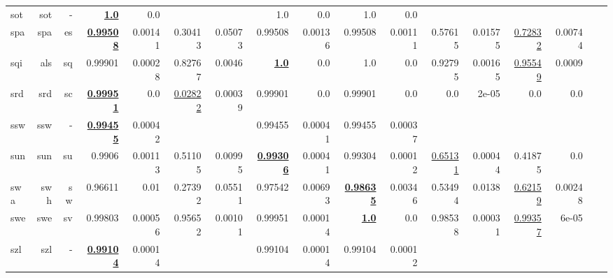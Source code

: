 \documentclass[11pt]{article}
\begin{document}
\begin{table*}[h]
{\begin{tabular}{lrrrrrrrrrrrrrrrr}
sot         & sot         & -         & \textbf{\underline{1.0}}         & 0.0         &          &          & 1.0         & 0.0         & 1.0         & 0.0         &          &          &          &          \\
spa         & spa         & es         & \textbf{\underline{0.99508}}         & 0.00141         & 0.30413         & 0.05073         & 0.99508         & 0.00136         & 0.99508         & 0.00111         & 0.57615         & 0.01575         & \underline{0.72832}         & 0.00744         \\
sqi         & als         & sq         & 0.99901         & 0.00028         & 0.82767         & 0.0046         & \textbf{\underline{1.0}}         & 0.0         & 1.0         & 0.0         & 0.92795         & 0.00165         & \underline{0.95549}         & 0.0009         \\
srd         & srd         & sc         & \textbf{\underline{0.99951}}         & 0.0         & \underline{0.02822}         & 0.00039         & 0.99901         & 0.0         & 0.99901         & 0.0         & 0.0         & 2e-05         & 0.0         & 0.0         \\
ssw         & ssw         & -         & \textbf{\underline{0.99455}}         & 0.00042         &          &          & 0.99455         & 0.00041         & 0.99455         & 0.00037         &          &          &          &          \\
sun         & sun         & su         & 0.9906         & 0.00113         & 0.51105         & 0.00995         & \textbf{\underline{0.99306}}         & 0.00041         & 0.99304         & 0.00012         & \underline{0.65131}         & 0.00044         & 0.41875         & 0.0         \\
swa         & swh         & sw         & 0.96611         & 0.01         & 0.27392         & 0.05511         & 0.97542         & 0.00693         & \textbf{\underline{0.98635}}         & 0.00346         & 0.53494         & 0.0138         & \underline{0.62159}         & 0.00248         \\
swe         & swe         & sv         & 0.99803         & 0.00056         & 0.95652         & 0.00101         & 0.99951         & 0.00014         & \textbf{\underline{1.0}}         & 0.0         & 0.98538         & 0.00031         & \underline{0.99357}         & 6e-05         \\
szl         & szl         & -         & \textbf{\underline{0.99104}}         & 0.00014         &          &          & 0.99104         & 0.00014         & 0.99104         & 0.00012         &          &          &          &          \\

\end{tabular}}
\end{table*}
\end{document}
